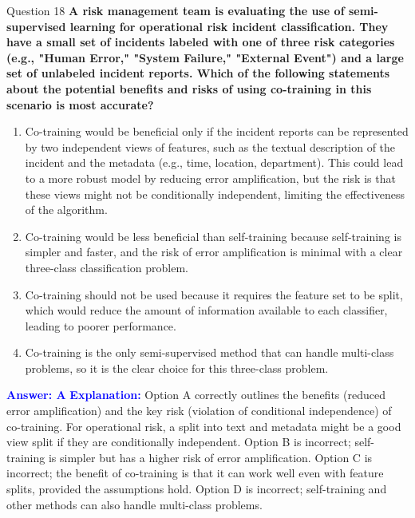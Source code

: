 \documentclass[8pt]{beamer}  %
\begin{document}
	\begin{frame}{Question 18}
		\textbf{A risk management team is evaluating the use of semi-supervised learning for operational risk incident classification. They have a small set of incidents labeled with one of three risk categories (e.g., "Human Error," "System Failure," "External Event") and a large set of unlabeled incident reports. Which of the following statements about the potential benefits and risks of using co-training in this scenario is most accurate?}
		\begin{enumerate}
			\item Co-training would be beneficial only if the incident reports can be represented by two independent views of features, such as the textual description of the incident and the metadata (e.g., time, location, department). This could lead to a more robust model by reducing error amplification, but the risk is that these views might not be conditionally independent, limiting the effectiveness of the algorithm.
			\item Co-training would be less beneficial than self-training because self-training is simpler and faster, and the risk of error amplification is minimal with a clear three-class classification problem.
			\item Co-training should not be used because it requires the feature set to be split, which would reduce the amount of information available to each classifier, leading to poorer performance.
			\item Co-training is the only semi-supervised method that can handle multi-class problems, so it is the clear choice for this three-class problem.
		\end{enumerate}
		\vspace{0.2cm}
		\textcolor{blue}{\textbf{Answer: A}}
		\vspace{0.2cm}
		\textcolor{blue}{\textbf{Explanation:}} Option A correctly outlines the benefits (reduced error amplification) and the key risk (violation of conditional independence) of co-training. For operational risk, a split into text and metadata might be a good view split if they are conditionally independent. Option B is incorrect; self-training is simpler but has a higher risk of error amplification. Option C is incorrect; the benefit of co-training is that it can work well even with feature splits, provided the assumptions hold. Option D is incorrect; self-training and other methods can also handle multi-class problems.
	\end{frame}
	
\end{document}
